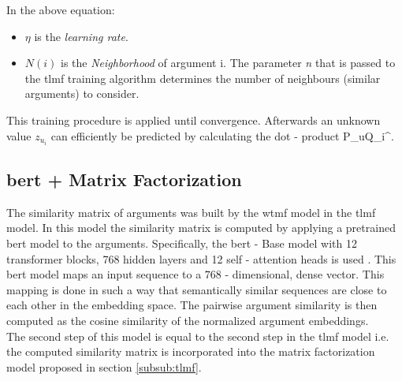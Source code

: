 In the above equation:
\begin{itemize}
    \item $\eta$ is the \textit{learning rate}. 
    \item $N(i)$ is the \textit{Neighborhood} of argument i. The parameter \textit{n} that is passed to the \acrshort{tlmf} training algorithm determines the number of neighbours (similar arguments) to consider.
\end{itemize}
This training procedure is applied until convergence. Afterwards an unknown value $z_u_i$ can efficiently be predicted by calculating the dot - product P_uQ_i^\top.  

\subsection{\acrshort{bert} + Matrix Factorization}
The similarity matrix of arguments was built by the \acrshort{wtmf} model in the \acrshort{tlmf} model. In this model the similarity matrix is computed by applying a pretrained \acrshort{bert} model to the arguments. Specifically, the \acrshort{bert} - Base model with 12 transformer blocks, 768 hidden layers and 12 self - attention heads is used \cite{devlin2018bert}. This \acrshort{bert} model maps an input sequence to a $768$ - dimensional, dense vector. This mapping is done in such a way that semantically similar sequences are close to each other in the embedding space. The pairwise argument similarity is then computed as the cosine similarity of the normalized argument embeddings.\\
The second step of this model is equal to the second step in the \acrshort{tlmf} model i.e. the computed similarity matrix is incorporated into the matrix factorization model proposed in section \ref{subsub:tlmf}. 

